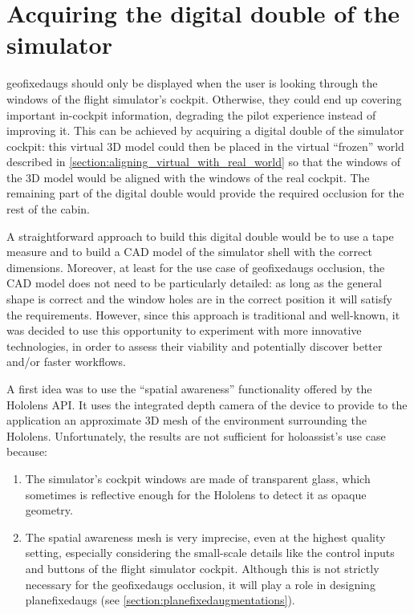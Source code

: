 \vfill

\section{Acquiring the digital double of the simulator}\label{section:acquiring_digital_double}

\Glspl{geofixedaug} should only be displayed when the user is looking through the windows of the flight simulator's cockpit. Otherwise, they could end up covering important in-cockpit information, degrading the pilot experience instead of improving it. This can be achieved by acquiring a digital double of the simulator cockpit: this virtual 3D model could then be placed in the virtual \enquote{frozen} world described in \autoref{section:aligning_virtual_with_real_world} so that the windows of the 3D model would be aligned with the windows of the real cockpit. The remaining part of the digital double would provide the required occlusion for the rest of the cabin. 

A straightforward approach to build this digital double would be to use a tape measure and to build a \gls{CAD} model of the simulator shell with the correct dimensions. Moreover, at least for the use case of \glspl{geofixedaug} occlusion, the \gls{CAD} model does not need to be particularly detailed: as long as the general shape is correct and the window holes are in the correct position it will satisfy the requirements. However, since this approach is traditional and well-known, it was decided to use this opportunity to experiment with more innovative technologies, in order to assess their viability and potentially discover better and/or faster workflows.

A first idea was to use the \enquote{spatial awareness} functionality offered by the Hololens \gls{API}. It uses the integrated depth camera of the device to provide to the application an approximate 3D mesh of the environment surrounding the Hololens. Unfortunately, the results are not sufficient for \gls{holoassist}'s use case because:

\begin{enumerate}
    \item The simulator's cockpit windows are made of transparent glass, which sometimes is reflective enough for the Hololens to detect it as opaque geometry.
    \item The spatial awareness mesh is very imprecise, even at the highest quality setting, especially considering the small-scale details like the control inputs and buttons of the flight simulator cockpit. Although this is not strictly necessary for the \glspl{geofixedaug} occlusion, it will play a role in designing \glspl{planefixedaug} (see \autoref{section:planefixedaugmentations}).
\end{enumerate}

